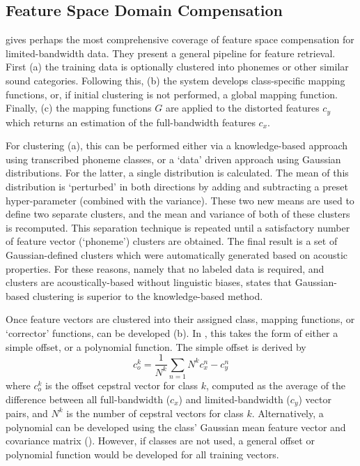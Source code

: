 \subsection{Feature Space Domain Compensation}\label{sec:feat-space-comp}

\cite{morales:09} gives perhaps the most comprehensive coverage of feature space compensation for limited-bandwidth data.  They present a general pipeline for feature retrieval.  First (a) the training data is optionally clustered into phonemes or other similar sound categories.  Following this, (b) the system develops class-specific mapping functions, or, if initial clustering is not performed, a global mapping function.  Finally, (c) the mapping functions $G$ are applied to the distorted features $c_y$ which returns an estimation of the full-bandwidth features $c_x$.

For clustering (a), this can be performed either via a knowledge-based approach using transcribed phoneme classes, or a `data' driven approach using Gaussian distributions.  For the latter, a single distribution is calculated.  The mean of this distribution is `perturbed' in both directions by adding and subtracting a preset hyper-parameter (combined with the variance).  These two new means are used to define two separate clusters, and the mean and variance of both of these clusters is recomputed.  This separation technique is repeated until a satisfactory number of feature vector (`phoneme') clusters are obtained.  The final result is a set of Gaussian-defined clusters which were automatically generated based on acoustic properties.  For these reasons, namely that no labeled data is required, and clusters are acoustically-based without linguistic biases, \cite{morales:05b} states that Gaussian-based clustering is superior to the knowledge-based method.

Once feature vectors are clustered into their assigned class, mapping functions, or `corrector' functions, can be developed (b).  In \cite{morales:05b}, this takes the form of either a simple offset, or a polynomial function.  The simple offset is derived by \begin{equation} c_o^k = \dfrac{1}{N^k} \sum_{n=1}{N^k} c_x^n - c_y^n \end{equation} where $c_o^k$ is the offset cepstral vector for class $k$, computed as the average of the difference between all full-bandwidth ($c_x$) and limited-bandwidth ($c_y$) vector pairs, and $N^k$ is the number of cepstral vectors for class $k$.  Alternatively, a polynomial can be developed using the class' Gaussian mean feature vector and covariance matrix (\cite{morales:05b,morales:09}).  However, if classes are not used, a general offset or polynomial function would be developed for all training vectors.

